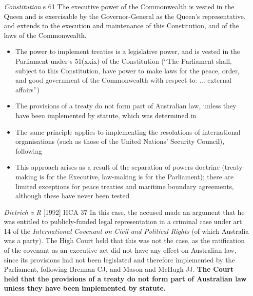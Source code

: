 \begin{statutedetails}{\textit{Constitution} s 61}\label{Constitution s 61}
    \flushleft
    The executive power of the Commonwealth is vested in the Queen and is exercisable by the Governor-General as the Queen's representative, and extends to the execution and maintenance of this Constitution, and of the laws of the Commonwealth.
\end{statutedetails}

\begin{itemize}
    \item The power to implement treaties is a legislative power, and is vested in the Parliament under s 51(xxix) of the Constitution (``The Parliament shall, subject to this Constitution, have power to make laws for the peace, order, and good government of the Commonwealth with respect to: ... external affairs'')
    \item The provisions of a treaty do not form part of Australian law, unless they have been implemented by statute, which was determined in 
    \item The same principle applies to implementing the resolutions of international organisations (such as those of the United Nations' Security Council), following 
    \item This approach arises as a result of the separation of powers doctrine (treaty-making is for the Executive, law-making is for the Parliament); there are limited exceptions for peace treaties and maritime boundary agreements, although these have never been tested
\end{itemize}

\begin{casedetails}{\textit{Dietrich v R} [1992] HCA 37}\label{case: Dietrich v R}
    \flushleft
    In this case, the accused made an argument that he was entitled to publicly-funded legal representation in a criminal case under art 14 of the \textit{International Covenant on Civil and Political Rights} (of which Australia was a party). The High Court held that this was not the case, as the ratification of the covenant as an executive act did not have any effect on Australian law, since its provisions had not been legislated and therefore implemented by the Parliament, following Brennan CJ, and Mason and McHugh JJ. \textbf{The Court held that the provisions of a treaty do not form part of Australian law unless they have been implemented by statute.}
\end{casedetails}

